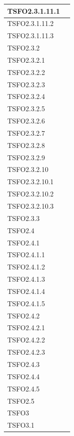 \begin{center}
\begin{longtable}{ | >{\centering\arraybackslash}m{5cm} | >{\centering\arraybackslash}m{5cm} | }
				TSFO2.3.1.11.1 & \done{} \\ \hline
				TSFO2.3.1.11.2 & \done{} \\ \hline
				TSFO2.3.1.11.3 & \done{} \\ \hline
				TSFO2.3.2 & \done{} \\ \hline
				TSFO2.3.2.1 & \done{} \\ \hline
				TSFO2.3.2.2 & \done{} \\ \hline
				TSFO2.3.2.3 & \done{} \\ \hline
				TSFO2.3.2.4 & \done{} \\ \hline
				TSFO2.3.2.5 & \done{} \\ \hline
				TSFO2.3.2.6 & \done{} \\ \hline
				TSFO2.3.2.7 & \done{} \\ \hline
				TSFO2.3.2.8 & \done{} \\ \hline
				TSFO2.3.2.9 & \done{} \\ \hline
				TSFO2.3.2.10 & \done{} \\ \hline
				TSFO2.3.2.10.1 & \done{} \\ \hline
				TSFO2.3.2.10.2 & \done{} \\ \hline
				TSFO2.3.2.10.3 & \done{} \\ \hline
				TSFO2.3.3 & \done{} \\ \hline
				TSFO2.4 & \done{} \\ \hline
				TSFO2.4.1 & \done{} \\ \hline
				TSFO2.4.1.1 & \done{} \\ \hline
				TSFO2.4.1.2 & \done{} \\ \hline
				TSFO2.4.1.3 & \done{} \\ \hline
				TSFO2.4.1.4 & \done{} \\ \hline
				TSFO2.4.1.5 & \done{} \\ \hline
				TSFO2.4.2 & \done{} \\ \hline
				TSFO2.4.2.1 & \done{} \\ \hline
				TSFO2.4.2.2 & \done{} \\ \hline
				TSFO2.4.2.3 & \done{} \\ \hline
				TSFO2.4.3 & \done{} \\ \hline
				TSFO2.4.4 & \done{} \\ \hline
				TSFO2.4.5 & \done{} \\ \hline
				TSFO2.5 & \done{} \\ \hline
				TSFO3 & \done{} \\ \hline
				TSFO3.1 & \done{} \\ \hline

\end{longtable}
\end{center}
